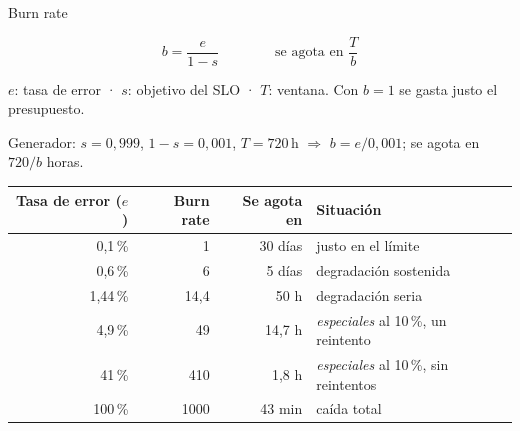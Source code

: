 \documentclass[institutional,screen,none]{ua-engineering-v6-beamer}
\begin{document}
\begin{frame}[t]{Burn rate}
\vspace{-0.8em}
\begin{uakeybox}
\vspace{-0.5em}
\[
b = \frac{e}{1 - s} \qquad\qquad \text{se agota en } \frac{T}{b}
\]
\vspace{-0.3em}
\end{uakeybox}
\vspace{0.2em}
{\small $e$: tasa de error · $s$: objetivo del SLO · $T$: ventana. Con $b = 1$ se gasta justo el presupuesto.}

\pause

{\small Generador: $s = 0{,}999$, $1 - s = 0{,}001$, $T = 720$\,h $\Rightarrow$ $b = e / 0{,}001$; se agota en $720 / b$ horas.}

\begin{center}
\footnotesize
\begin{tabular}{rrrl}
\toprule
\textbf{Tasa de error ($e$)} & \textbf{Burn rate} & \textbf{Se agota en} & \textbf{Situación} \\
\midrule
0,1\,\% & 1 & 30 días & justo en el límite \\
0,6\,\% & 6 & 5 días & degradación sostenida \\
1,44\,\% & 14,4 & 50 h & degradación seria \\
4,9\,\% & 49 & 14,7 h & \emph{especiales} al 10\,\%, un reintento \\
41\,\% & 410 & 1,8 h & \emph{especiales} al 10\,\%, sin reintentos \\
100\,\% & 1000 & 43 min & caída total \\
\bottomrule
\end{tabular}
\end{center}
\end{frame}
\end{document}
